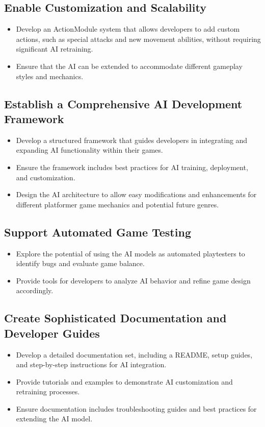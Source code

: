 \documentclass[12pt,oneside,openright,a4paper]{cpe-english-project}
\begin{document}
\subsection{Enable Customization and Scalability}
\begin{itemize}
\item Develop an ActionModule system that allows developers to add custom actions, such as special attacks and new movement abilities, without requiring significant AI retraining.
\item Ensure that the AI can be extended to accommodate different gameplay styles and mechanics.
\end{itemize}
\subsection{Establish a Comprehensive AI Development Framework}
\begin{itemize}
\item Develop a structured framework that guides developers in integrating and expanding AI functionality within their games.
\item Ensure the framework includes best practices for AI training, deployment, and customization.
\item Design the AI architecture to allow easy modifications and enhancements for different platformer game mechanics and potential future genres.
\end{itemize}
\subsection{Support Automated Game Testing}
\begin{itemize}
\item Explore the potential of using the AI models as automated playtesters to identify bugs and evaluate game balance.
\item Provide tools for developers to analyze AI behavior and refine game design accordingly.
\end{itemize}
\subsection{Create Sophisticated Documentation and Developer Guides}
\begin{itemize}
\item Develop a detailed documentation set, including a README, setup guides, and step-by-step instructions for AI integration.
\item Provide tutorials and examples to demonstrate AI customization and retraining processes.
\item Ensure documentation includes troubleshooting guides and best practices for extending the AI model.
\end{itemize}
\end{document}
